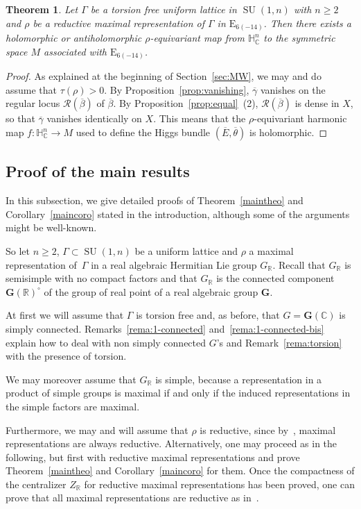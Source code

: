 \documentclass[JEP,XML,SOM,Unicode,NoFloatCountersInSection]{cedram}
\let\mathcal\mathscr
\newcommand{\citestar}[3]{\cite[#3]{#1}}
\theoremstyle{plain}
\newtheorem{theo}{Theorem}[section]
\theoremstyle{definition}
\let\ov\overline
\DeclareMathOperator{\SU}{SU}
\newcommand{\cR}{\mathcal{R}}
\newcommand{\bC}{\mathbb{C}}
\newcommand{\bH}{\mathbb{H}}
\newcommand{\bR}{\mathbb{R}}
\newcommand{\HC}{{\mathbb{H}^n_\mathbb{C}}}
\newcommand{\bfG}{\boldsymbol{G}}
\newcommand{\ovE}{\ov{E}}
\newcommand{\ovb}{\ov{\beta}}
\newcommand{\ovg}{\ov{\gamma}}
\newcommand{\ovt}{\ov{\theta}}
\begin{document}
\begin{theo}\label{thm:E6}
Let $\Gamma$ be a torsion free uniform lattice in $\SU(1,n)$ with $n\geq 2$ and $\rho$ be a reductive maximal representation of
$\Gamma$ in $\mathrm{E}_{6(-14)}$. Then there exists a holomorphic or antiholomorphic $\rho$-equivariant
map from $\bH^n_\bC$ to the symmetric space $M$
associated with $\mathrm{E}_{6(-14)}$.
\end{theo}

\begin{proof}
As explained at the beginning of Section~\ref{sec:MW}, we may and do assume that
$\tau(\rho)>0$.
By Proposition~\ref{prop:vanishing}, $\ovg$ vanishes on the regular locus ${\cR}(\ovb)$ of $\ovb$. By
Proposition~\ref{prop:equal}~(2), ${\cR}(\ovb)$ is dense in $X$, so that $\ovg$ vanishes
identically on $X$. This means that the $\rho$-equivariant harmonic map $f:\HC\to M$ used to
define the Higgs bundle $(\ovE,\ovt)$ is holomorphic.
\end{proof}

\subsection{Proof of the main results}
\label{subsec:proof}

In this subsection, we give detailed proofs of Theorem~\ref{maintheo} and Corollary~\ref{maincoro}
stated in the introduction,
although some of the arguments might be well-known.

So let $n\geq 2$, $\Gamma\subset\SU(1,n)$ be a uniform lattice and $\rho$ a maximal
representation of~$\Gamma$ in a real algebraic Hermitian Lie group $G_\bR$.
Recall that $G_\bR$ is semisimple
with no compact factors and that $G_\bR$ is the connected component
$\bfG(\bR)^\circ$ of the group of real point of a real algebraic group $\bfG$.

At first we will assume that $\Gamma$ is torsion free and, as before, that $G = \bfG(\bC)$ is
simply connected. Remarks~\ref{rema:1-connected} and~\ref{rema:1-connected-bis} explain how to deal
with non simply connected $G$'s and Remark~\ref{rema:torsion} with the presence of torsion.

We may moreover assume that $G_\bR$ is simple,
because a representation in a product of simple groups
is maximal if and only if the induced representations in the simple factors are maximal.

Furthermore, we may and will assume that $\rho$ is
reductive, since by~\citestar{BIW}*{Cor.\,4}, maximal representations are always
reductive. Alternatively, one may proceed as in the following, but first with
reductive maximal representations and prove Theorem~\ref{maintheo} and Corollary~\ref{maincoro} for
them. Once the compactness of the centralizer $Z_\bR$ for reductive maximal representations has been
proved, one can prove that all maximal representations are reductive as
in~\citestar{KM}*{}.
\end{document}
